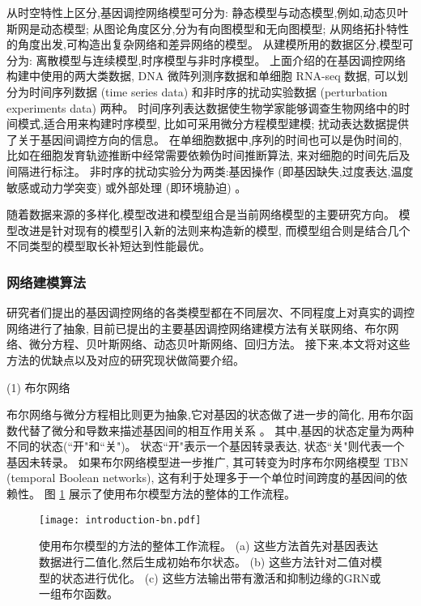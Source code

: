 从时空特性上区分,基因调控网络模型可分为:
静态模型与动态模型,例如,动态贝叶斯网是动态模型;
从图论角度区分,分为有向图模型和无向图模型;
从网络拓扑特性的角度出发,可构造出复杂网络和差异网络的模型。 
从建模所用的数据区分,模型可分为:
离散模型与连续模型,时序模型与非时序模型。
上面介绍的在基因调控网络构建中使用的两大类数据, DNA 微阵列测序数据和单细胞 RNA-seq 数据, 
可以划分为时间序列数据 (time series data) 和非时序的扰动实验数据 (perturbation experiments data) 两种。
时间序列表达数据使生物学家能够调查生物网络中的时间模式,适合用来构建时序模型, 比如可采用微分方程模型建模; 
扰动表达数据提供了关于基因间调控方向的信息。
在单细胞数据中,序列的时间也可以是伪时间的, 比如在细胞发育轨迹推断中经常需要依赖伪时间推断算法, 来对细胞的时间先后及间隔进行标注。
非时序的扰动实验分为两类:基因操作 (即基因缺失,过度表达,温度敏感或动力学突变) \cite{holstege1998dissecting} 或外部处理 (即环境胁迫) \cite{gasch2000genomic}。

随着数据来源的多样化,模型改进和模型组合是当前网络模型的主要研究方向。
模型改进是针对现有的模型引入新的法则来构造新的模型,
而模型组合则是结合几个不同类型的模型取长补短达到性能最优。

\subsubsection{网络建模算法}
研究者们提出的基因调控网络的各类模型都在不同层次、不同程度上对真实的调控网络进行了抽象,
目前已提出的主要基因调控网络建模方法有关联网络、布尔网络、微分方程、贝叶斯网络、动态贝叶斯网络、回归方法。
接下来,本文将对这些方法的优缺点以及对应的研究现状做简要介绍。

(1) 布尔网络

布尔网络与微分方程相比则更为抽象,它对基因的状态做了进一步的简化,
用布尔函数代替了微分和导数来描述基因间的相互作用关系 \cite{shmulevich2002probabilistic,kim2007boolean,bornholdt2008boolean,zhou2016relative} 。
其中,基因的状态定量为两种不同的状态(``开"和``关")。
状态``开"表示一个基因转录表达, 状态``关"则代表一个基因未转录。
如果布尔网络模型进一步推广, 其可转变为时序布尔网络模型 TBN (temporal Boolean networks), 这有利于处理多于一个单位时间跨度的基因间的依赖性。
图 \ref{fig:pre-bn} 展示了使用布尔模型方法的整体的工作流程。
\begin{figure}[!htbp]
    \centering
    \texttt{[image: introduction-bn.pdf]}
    \caption{
        使用布尔模型的方法的整体工作流程。
        (a) 这些方法首先对基因表达数据进行二值化,然后生成初始布尔状态。
        (b) 这些方法针对二值对模型的状态进行优化。
        (c) 这些方法输出带有激活和抑制边缘的GRN或一组布尔函数。
    }
    \label{fig:pre-bn}
\end{figure}

